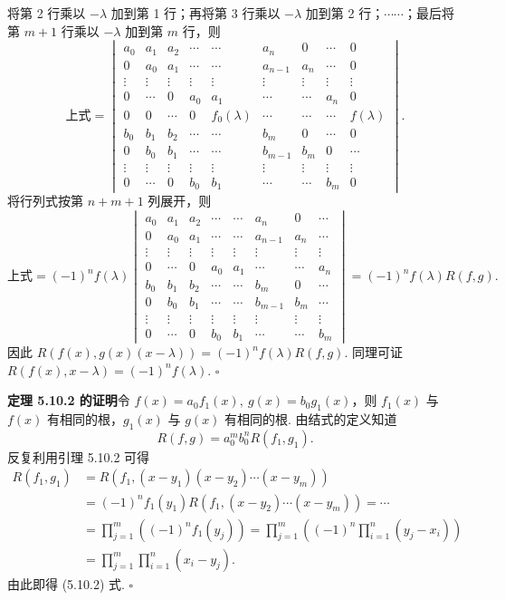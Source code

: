 \documentclass[UTF8, 12pt, fontset=fandol, oneside]{ctexart}
\begin{document}
将第 2 行乘以 $-\lambda$ 加到第 1 行；再将第 3 行乘以 $-\lambda$ 加到第 2 行；$\cdots\cdots$；最后将第 $m+1$ 行乘以 $-\lambda$ 加到第 $m$ 行，则
\[
\text{上式}=
\begin{vmatrix}
a_0&a_1&a_2&\cdots&\cdots&a_n&0&\cdots&0\\
0&a_0&a_1&\cdots&\cdots&a_{n-1}&a_n&\cdots&0\\
\vdots&\vdots&\vdots&\vdots&\vdots&\vdots&\vdots&\vdots&\vdots\\
0&\cdots&0&a_0&a_1&\cdots&\cdots&a_n&0\\
0&0&\cdots&0&f_0(\lambda)&\cdots&\cdots&\cdots&f(\lambda)\\
b_0&b_1&b_2&\cdots&\cdots&b_m&0&\cdots&0\\
0&b_0&b_1&\cdots&\cdots&b_{m-1}&b_m&0&\cdots\\
\vdots&\vdots&\vdots&\vdots&\vdots&\vdots&\vdots&\vdots&\vdots\\
0&\cdots&0&b_0&b_1&\cdots&\cdots&b_m&0
\end{vmatrix}.
\]
将行列式按第 $n+m+1$ 列展开，则
\[
\text{上式}=(-1)^nf(\lambda)
\begin{vmatrix}
a_0&a_1&a_2&\cdots&\cdots&a_n&0&\cdots\\
0&a_0&a_1&\cdots&\cdots&a_{n-1}&a_n&\cdots\\
\vdots&\vdots&\vdots&\vdots&\vdots&\vdots&\vdots&\vdots\\
0&\cdots&0&a_0&a_1&\cdots&\cdots&a_n\\
b_0&b_1&b_2&\cdots&\cdots&b_m&0&\cdots\\
0&b_0&b_1&\cdots&\cdots&b_{m-1}&b_m&\cdots\\
\vdots&\vdots&\vdots&\vdots&\vdots&\vdots&\vdots&\vdots\\
0&\cdots&0&b_0&b_1&\cdots&\cdots&b_m
\end{vmatrix}
=(-1)^nf(\lambda)R(f,g).
\]
因此 $R(f(x),g(x)(x-\lambda))=(-1)^nf(\lambda)R(f,g)$. 同理可证 $R(f(x),x-\lambda)=(-1)^nf(\lambda)$. $\square$

\noindent\textbf{定理 5.10.2 的证明}\quad 令 $f(x)=a_0f_1(x),\ g(x)=b_0g_1(x)$，则 $f_1(x)$ 与 $f(x)$ 有相同的根，$g_1(x)$ 与 $g(x)$ 有相同的根. 由结式的定义知道
\[
R(f,g)=a_0^mb_0^nR(f_1,g_1).
\]
反复利用引理 5.10.2 可得
\[
\begin{aligned}
R(f_1,g_1)
&=R(f_1,(x-y_1)(x-y_2)\cdots(x-y_m))\\
&=(-1)^nf_1(y_1)R(f_1,(x-y_2)\cdots(x-y_m))=\cdots\\
&=\prod_{j=1}^m\left((-1)^nf_1(y_j)\right)
=\prod_{j=1}^m\left((-1)^n\prod_{i=1}^n(y_j-x_i)\right)\\
&=\prod_{j=1}^m\prod_{i=1}^n(x_i-y_j).
\end{aligned}
\]
由此即得 (5.10.2) 式. $\square$
\end{document}
